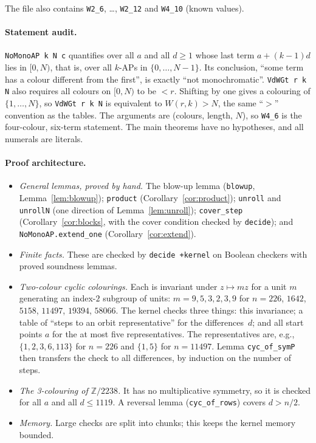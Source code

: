 \documentclass[11pt]{article}
\numberwithin{equation}{section}
\theoremstyle{definition}
\theoremstyle{remark}
\newcommand{\Z}{\mathbb Z}
\newcommand{\W}{W}
\begin{document}
The file also contains \texttt{W2\_6}, \dots, \texttt{W2\_12} and \texttt{W4\_10} (known values).

\paragraph{Statement audit.}
\texttt{NoMonoAP k N c} quantifies over all $a$ and all $d\ge1$ whose last term
$a+(k-1)d$ lies in $[0,N)$, that is, over all $k$-APs in $\{0,\dots,N-1\}$.  Its conclusion,
``some term has a colour different from the first'', is exactly ``not monochromatic''.
\texttt{VdWGt r k N} also requires all colours on $[0,N)$ to be $<r$.  Shifting by one gives a
colouring of $\{1,\dots,N\}$, so \texttt{VdWGt r k N} is equivalent to $\W(r,k)>N$, the same
``$>$'' convention as the tables.  The arguments are (colours, length, $N$), so \texttt{W4\_6} is
the four-colour, six-term statement.  The main theorems have no hypotheses, and all numerals are
literals.

\paragraph{Proof architecture.}
\begin{itemize}
\item \emph{General lemmas, proved by hand.}  The blow-up lemma (\texttt{blowup},
  Lemma~\ref{lem:blowup}); \texttt{product} (Corollary~\ref{cor:product}); \texttt{unroll} and
  \texttt{unrollN} (one direction of Lemma~\ref{lem:unroll}); \texttt{cover\_step}
  (Corollary~\ref{cor:blocks}, with the cover condition checked by \texttt{decide}); and
  \texttt{NoMonoAP.extend\_one} (Corollary~\ref{cor:extend}).
\item \emph{Finite facts.}  These are checked by \texttt{decide +kernel} on Boolean checkers with
  proved soundness lemmas.
\item \emph{Two-colour cyclic colourings.}  Each is invariant under $z\mapsto mz$ for a unit $m$
  generating an index-$2$ subgroup of units: $m=9,5,3,2,3,9$ for $n=226$, $1642$, $5158$,
  $11497$, $19394$, $58066$.  The kernel checks three things: this invariance; a table of
  ``steps to an orbit representative'' for the differences~$d$; and all start points $a$ for
  the at most five representatives.  The representatives are, e.g., $\{1,2,3,6,113\}$ for
  $n=226$ and $\{1,5\}$ for $n=11497$.  Lemma \texttt{cyc\_of\_symP} then transfers the check to
  all differences, by induction on the number of steps.
\item \emph{The 3-colouring of $\Z/2238$.}  It has no multiplicative symmetry, so it is checked
  for all $a$ and all $d\le1119$.  A reversal lemma (\texttt{cyc\_of\_rows}) covers $d>n/2$.
\item \emph{Memory.}  Large checks are split into chunks; this keeps the kernel memory bounded.
\end{itemize}
\end{document}
